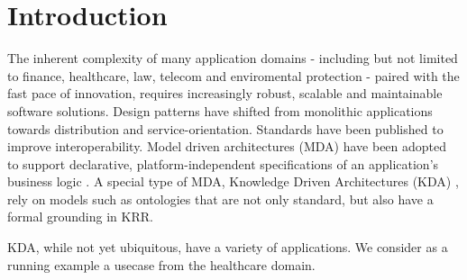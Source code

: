 \documentclass[runningheads]{llncs}
\begin{document}
\section{Introduction}
The inherent complexity of many application domains \-- including but not limited to finance, healthcare, law, telecom and enviromental protection \-- paired with the fast pace of innovation, requires increasingly robust, scalable and maintainable software solutions. Design patterns have shifted from monolithic applications towards distribution and service-orientation. Standards have been published to improve interoperability. Model driven architectures (MDA) have been adopted to support declarative, platform-independent specifications of an application's business logic \cite{Mellor:2004:MD:983969}. A special type of MDA, Knowledge Driven Architectures (KDA) \cite{Rector:2010}, rely on models such as ontologies that are not only standard, but also have a formal grounding in KRR. 


KDA, while not yet ubiquitous, have a variety of applications. We consider as a running example a usecase from the healthcare domain.
\end{document}
